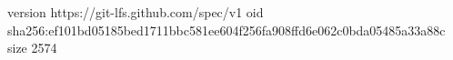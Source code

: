 version https://git-lfs.github.com/spec/v1
oid sha256:ef101bd05185bed1711bbc581ee604f256fa908ffd6e062c0bda05485a33a88c
size 2574
